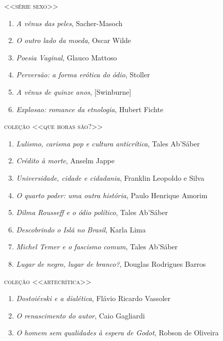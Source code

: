 \medskip

\pagebreak

{\large\textsc{<<série sexo>>}}

\begin{enumerate}
\setlength\parskip{4.2pt}
\setlength\itemsep{-1.4mm}

\item \textit{A vênus das peles}, Sacher{}-Masoch
\item \textit{O outro lado da moeda}, Oscar Wilde
\item \textit{Poesia Vaginal}, Glauco Mattoso 
\item \textit{Perversão: a forma erótica do ódio}, Stoller
\item \textit{A vênus de quinze anos}, [Swinburne]
\item \textit{Explosao: romance da etnologia}, Hubert Fichte

\end{enumerate}

\medskip
{\large\textsc{coleção <<que horas são?>>}}

\begin{enumerate}
\setlength\parskip{4.2pt}
\setlength\itemsep{-1.4mm}
\item \textit{Lulismo, carisma pop e cultura anticrítica}, Tales Ab'Sáber
\item \textit{Crédito à morte}, Anselm Jappe
\item \textit{Universidade, cidade e cidadania}, Franklin Leopoldo e Silva
\item \textit{O quarto poder: uma outra história}, Paulo Henrique Amorim
\item \textit{Dilma Rousseff e o ódio político}, Tales Ab'Sáber
\item \textit{Descobrindo o Islã no Brasil}, Karla Lima
\item \textit{Michel Temer e o fascismo comum}, Tales Ab'Sáber
\item \textit{Lugar de negro, lugar de branco?}, Douglas Rodrigues Barros
\end{enumerate}

\medskip
{\large\textsc{coleção <<artecrítica>>}}

\begin{enumerate}
\setlength\parskip{4.2pt}
\setlength\itemsep{-1.4mm}
\item \textit{Dostoiévski e a dialética}, Flávio Ricardo Vassoler
\item \textit{O renascimento do autor}, Caio Gagliardi
\item \textit{O homem sem qualidades à espera de Godot}, Robson de Oliveira
\end{enumerate}

